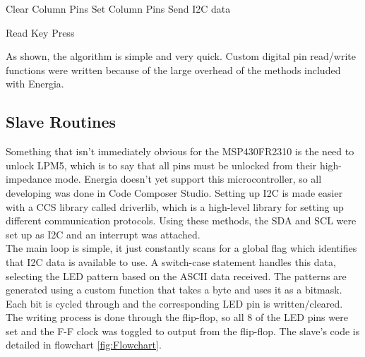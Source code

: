 \documentclass{article}
\begin{document}
\begin{center}
	\begin{minipage}{0.6\linewidth} %
		\begin{algorithm}[H]
			\medskip
			Clear Column Pins\;
			Set Column Pins\;
			Send I2C data\;
			\caption{Read Key Press} %
			\label{alg:KeyPress}   %
		\end{algorithm}
	\end{minipage}
\end{center}

\noindent As shown, the algorithm is simple and very quick. Custom digital pin read/write functions were written because of the large overhead of the methods included with Energia.

\subsection*{Slave Routines}

Something that isn't immediately obvious for the MSP430FR2310 is the need to unlock LPM5, which is to say that all pins must be unlocked from their high-impedance mode. Energia doesn't yet support this microcontroller, so all developing was done in Code Composer Studio. Setting up I2C is made easier with a CCS library called driverlib, which is a high-level library for setting up different communication protocols. Using these methods, the SDA and SCL were set up as I2C and an interrupt was attached.\\

\noindent The main loop is simple, it just constantly scans for a global flag which identifies that I2C data is available to use. A switch-case statement handles this data, selecting the LED pattern based on the ASCII data received. The patterns are generated using a custom function that takes a byte and uses it as a bitmask. Each bit is cycled through and the corresponding LED pin is written/cleared. The writing process is done through the flip-flop, so all 8 of the LED pins were set and the F-F clock was toggled to output from the flip-flop. The slave's code is detailed in flowchart \ref{fig:Flowchart}.
\end{document}
